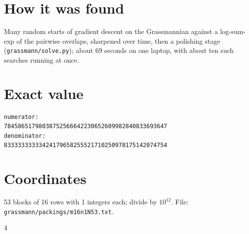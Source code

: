 \documentclass[11pt,a4paper]{article}
\begin{document}
\section{How it was found}
Many random starts of gradient descent on the Grassmannian against a log-sum-exp of the pairwise overlaps, sharpened over time, then a polishing stage (\texttt{grassmann/solve.py}); about 69 seconds on one laptop, with about ten such searches running at once.


\appendix
\section{Exact value}
{\small
\begin{verbatim}
numerator:
78458651798038752566642230652609982840833693647
denominator:
83333333333424179658255521710250978175142074754
\end{verbatim}}

\section{Coordinates}
53 blocks of 16 rows with 1 integers each; divide by $10^{12}$. File: \texttt{grassmann/packings/m16n1N53.txt}.
{\tiny
\begin{multicols}{4}
\end{multicols}}
\end{document}
